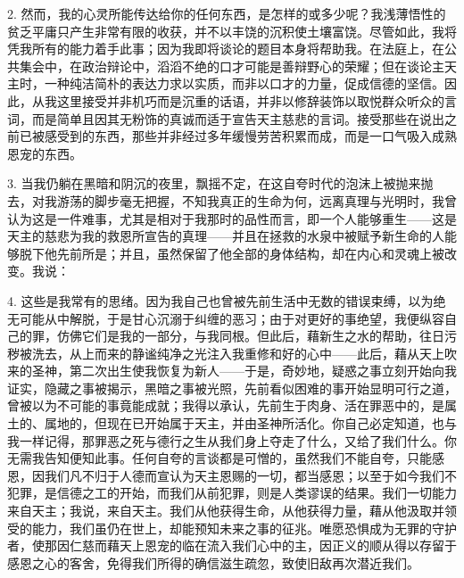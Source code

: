 2. 然而，我的心灵所能传达给你的任何东西，是怎样的或多少呢？我浅薄悟性的贫乏平庸只产生非常有限的收获，并不以丰饶的沉积使土壤富饶。尽管如此，我将凭我所有的能力着手此事；因为我即将谈论的题目本身将帮助我。在法庭上，在公共集会中，在政治辩论中，滔滔不绝的口才可能是善辩野心的荣耀；但在谈论主天主时，一种纯洁简朴的表达力求以实质，而非以口才的力量，促成信德的坚信。因此，从我这里接受并非机巧而是沉重的话语，并非以修辞装饰以取悦群众听众的言词，而是简单且因其无粉饰的真诚而适于宣告天主慈悲的言词。接受那些在说出之前已被感受到的东西，那些并非经过多年缓慢劳苦积累而成，而是一口气吸入成熟恩宠的东西。\par

3. 当我仍躺在黑暗和阴沉的夜里，飘摇不定，在这自夸时代的泡沫上被抛来抛去，对我游荡的脚步毫无把握，不知我真正的生命为何，远离真理与光明时，我曾认为这是一件难事，尤其是相对于我那时的品性而言，即一个人能够重生——这是天主的慈悲为我的救恩所宣告的真理——并且在拯救的水泉中被赋予新生命的人能够脱下他先前所是；并且，虽然保留了他全部的身体结构，却在内心和灵魂上被改变。我说：\par

4. 这些是我常有的思绪。因为我自己也曾被先前生活中无数的错误束缚，以为绝无可能从中解脱，于是甘心沉溺于纠缠的恶习；由于对更好的事绝望，我便纵容自己的罪，仿佛它们是我的一部分，与我同根。但此后，藉新生之水的帮助，往日污秽被洗去，从上而来的静谧纯净之光注入我重修和好的心中——此后，藉从天上吹来的圣神，第二次出生使我恢复为新人——于是，奇妙地，疑惑之事立刻开始向我证实，隐藏之事被揭示，黑暗之事被光照，先前看似困难的事开始显明可行之道，曾被以为不可能的事竟能成就；我得以承认，先前生于肉身、活在罪恶中的，是属土的、属地的，但现在已开始属于天主，并由圣神所活化。你自己必定知道，也与我一样记得，那罪恶之死与德行之生从我们身上夺走了什么，又给了我们什么。你无需我告知便知此事。任何自夸的言谈都是可憎的，虽然我们不能自夸，只能感恩，因我们凡不归于人德而宣认为天主恩赐的一切，都当感恩；以至于如今我们不犯罪，是信德之工的开始，而我们从前犯罪，则是人类谬误的结果。我们一切能力来自天主；我说，来自天主。我们从他获得生命，从他获得力量，藉从他汲取并领受的能力，我们虽仍在世上，却能预知未来之事的征兆。唯愿恐惧成为无罪的守护者，使那因仁慈而藉天上恩宠的临在流入我们心中的主，因正义的顺从得以存留于感恩之心的客舍，免得我们所得的确信滋生疏忽，致使旧敌再次潜近我们。\par

